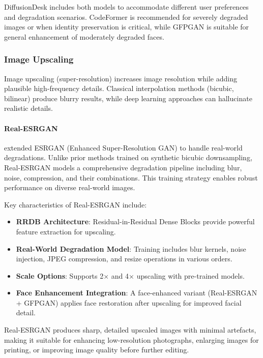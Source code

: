 \documentclass[12pt,a4paper]{report}
\begin{document}
DiffusionDesk includes both models to accommodate different user preferences and degradation scenarios. CodeFormer is recommended for severely degraded images or when identity preservation is critical, while GFPGAN is suitable for general enhancement of moderately degraded faces.

\subsubsection{Image Upscaling}

Image upscaling (super-resolution) increases image resolution while adding plausible high-frequency details. Classical interpolation methods (bicubic, bilinear) produce blurry results, while deep learning approaches can hallucinate realistic details.

\paragraph{Real-ESRGAN}

\citet{wang2021realesrgan} extended ESRGAN (Enhanced Super-Resolution GAN) to handle real-world degradations. Unlike prior methods trained on synthetic bicubic downsampling, Real-ESRGAN models a comprehensive degradation pipeline including blur, noise, compression, and their combinations. This training strategy enables robust performance on diverse real-world images.

Key characteristics of Real-ESRGAN include:

\begin{itemize}
    \item \textbf{RRDB Architecture}: Residual-in-Residual Dense Blocks provide powerful feature extraction for upscaling.
    \item \textbf{Real-World Degradation Model}: Training includes blur kernels, noise injection, JPEG compression, and resize operations in various orders.
    \item \textbf{Scale Options}: Supports 2$\times$ and 4$\times$ upscaling with pre-trained models.
    \item \textbf{Face Enhancement Integration}: A face-enhanced variant (Real-ESRGAN + GFPGAN) applies face restoration after upscaling for improved facial detail.
\end{itemize}

Real-ESRGAN produces sharp, detailed upscaled images with minimal artefacts, making it suitable for enhancing low-resolution photographs, enlarging images for printing, or improving image quality before further editing.
\end{document}
